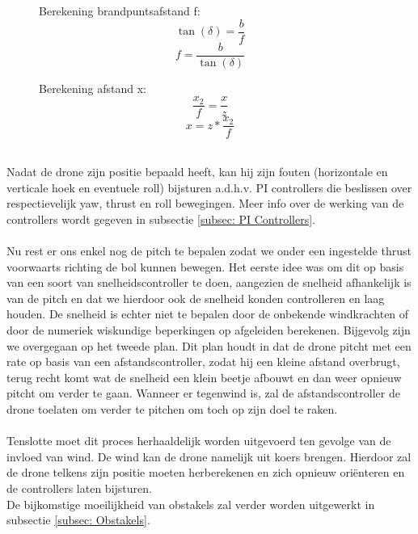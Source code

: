 \begin{figure}[h]
	\centering
	\begin{minipage}{.5\textwidth}
		Berekening brandpuntsafstand f:
		\begin{equation} \label{eq:RelatieveVerticaleHoekBegin}
		\tan(\delta) = \frac{b}{f}
		\end{equation}
		\begin{equation} 
		f = \frac{b}{\tan(\delta)}
		\end{equation}
	\end{minipage}
	\begin{minipage}{.45\textwidth}
		Berekening afstand x:
		\begin{equation} 
		\frac{x_2}{f} = \frac{x}{z}
		\end{equation}
		\begin{equation} \label{eq:RelatieveVerticaleHoekEind}
		x = z * \frac{x_2}{f}	
		\end{equation}
	\end{minipage}%
\end{figure}
\\
Nadat de drone zijn positie bepaald heeft, kan hij zijn fouten (horizontale en verticale hoek en eventuele roll) bijsturen a.d.h.v. PI controllers die beslissen over respectievelijk yaw, thrust en roll bewegingen. Meer info over de werking van de controllers wordt gegeven in subsectie \ref{subsec: PI Controllers}.
\\
\\
Nu rest er ons enkel nog de pitch te bepalen zodat we onder een ingestelde thrust voorwaarts richting de bol kunnen bewegen. Het eerste idee was om dit op basis van een soort van snelheidscontroller te doen, aangezien de snelheid afhankelijk is van de pitch en dat we hierdoor ook de snelheid konden controlleren en laag houden. De snelheid is echter niet te bepalen door de onbekende windkrachten of door de numeriek wiskundige beperkingen op afgeleiden berekenen. Bijgevolg zijn we overgegaan op het tweede plan. Dit plan houdt in dat de drone pitcht met een rate op basis van een afstandscontroller, zodat hij een kleine afstand overbrugt, terug recht komt wat de snelheid een klein beetje afbouwt en dan weer opnieuw pitcht om verder te gaan. Wanneer er tegenwind is, zal de afstandscontroller de drone toelaten om verder te pitchen om toch op zijn doel te raken.
\\
\\
Tenslotte moet dit proces herhaaldelijk worden uitgevoerd ten gevolge van de invloed van wind. De wind kan de drone namelijk uit koers brengen. Hierdoor zal de drone telkens zijn positie moeten herberekenen en zich opnieuw ori\"enteren en de controllers laten bijsturen.
\\
De bijkomstige moeilijkheid van obstakels zal verder worden uitgewerkt in subsectie \ref{subsec: Obstakels}.